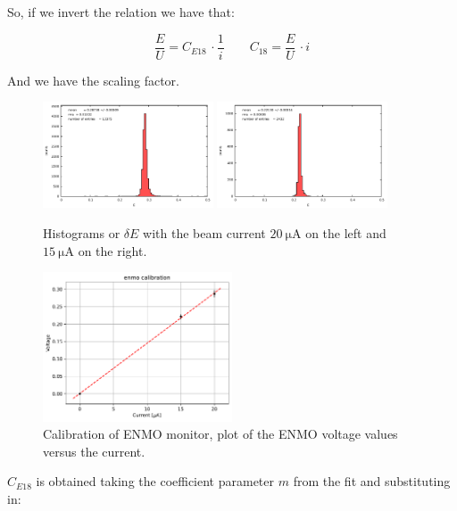 So, if we invert the relation we have that:

\begin{equation}
\frac{E}{U} = C_{E18} \, \cdot \frac{1}{i} \qquad  C_{18} = \frac{E}{U} \, \cdot i
\end{equation}  

And we have the scaling factor.

\begin{figure}[hbtp]
\centering
\includegraphics[width = 0.45\textwidth]{Analysis/ENMOvoltage20.pdf}
\includegraphics[width = 0.45\textwidth]{Analysis/ENMOvoltage15.pdf} 
\caption{Histograms or $\delta E$ with the beam current $\SI{20}{\micro \ampere}$ on the left and $\SI{15}{\micro \ampere}$ on the right.}
\end{figure}


\begin{figure}[hbtp]
\centering
\includegraphics[width = 0.5\textwidth]{Analysis/Calibrations/E18_Calibration.pdf}
\caption{Calibration of ENMO monitor, plot of the ENMO voltage values versus the current.}
\end{figure}


$C_{E18}$ is obtained taking the coefficient parameter $m$ from the fit and substituting in:

